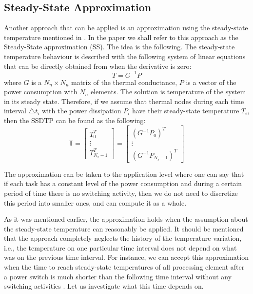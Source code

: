 \subsection{Steady-State Approximation}
Another approach that can be applied is an approximation using the steady-state temperature mentioned in \cite{huang2009}. In the paper we shall refer to this approach as the Steady-State approximation (SS). The idea is the following. The steady-state temperature behaviour is described with the following system of linear equations that can be directly obtained from  when the derivative is zero:
\[
  T = G^{-1} P
\]
where $G$ is a $N_n \times N_n$ matrix of the thermal conductance, $P$ is a vector of the power consumption with $N_n$ elements. The solution is temperature of the system in its steady state. Therefore, if we assume that thermal nodes during each time interval $\triangle t_i$ with the power dissipation $P_i$ have their steady-state temperature $T_i$, then the SSDTP can be found as the following:
\begin{equation*}
  \mathbb{T} = \left[
    \begin{array}{c}
      T_0^T \\
      \vdots \\
      T_{N_s - 1}^T
    \end{array}
  \right] = \left[
    \begin{array}{c}
      (G^{-1} P_0)^T \\
      \vdots \\
      (G^{-1} P_{N_s - 1})^T
    \end{array}
  \right]
\end{equation*}

The approximation can be taken to the application level where one can say that if each task has a constant level of the power consumption and during a certain period of time there is no switching activity, then we do not need to discretize this period into smaller ones, and can compute it as a whole.

As it was mentioned earlier, the approximation holds when the assumption about the steady-state temperature can reasonably be applied. It should be mentioned that the approach completely neglects the history of the temperature variation, i.e., the temperature on one particular time interval does not depend on what was on the previous time interval. For instance, we can accept this approximation when the time to reach steady-state temperatures of all processing element after a power switch is much shorter than the following time interval without any switching activities \cite{huang2009}. Let us investigate what this time depends on.

